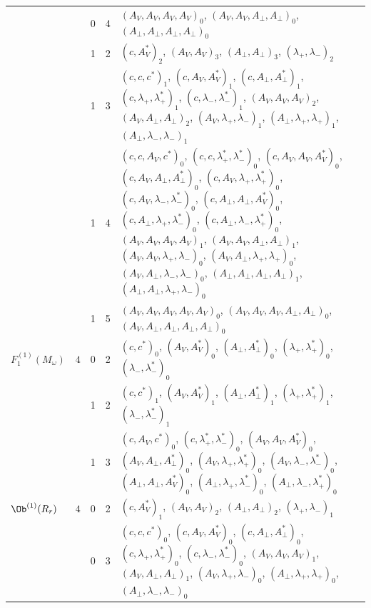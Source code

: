 {\begin{longtable}{>{\raggedright}p{2.3cm}|p{0.6cm}|p{0.25cm}|p{0.25cm}|>{\raggedright\arraybackslash}p{11.6cm}}
 &  & 0 & 4 & $(A_V,A_V,A_V,A_V)_{0}$, $(A_V,A_V,A_\perp,A_\perp)_{0}$, $(A_\perp,A_\perp,A_\perp,A_\perp)_{0}$ \\
 &  & 1 & 2 & $(c,A^*_V)_{2}$, $(A_V,A_V)_{3}$, $(A_\perp,A_\perp)_{3}$, $(\lambda_+,\lambda_-)_{2}$ \\
 &  & 1 & 3 & $(c,c,c^*)_{1}$, $(c,A_V,A^*_V)_{1}$, $(c,A_\perp,A^*_\perp)_{1}$, $(c,\lambda_+,\lambda^*_+)_{1}$, $(c,\lambda_-,\lambda^*_-)_{1}$, $(A_V,A_V,A_V)_{2}$, $(A_V,A_\perp,A_\perp)_{2}$, $(A_V,\lambda_+,\lambda_-)_{1}$, $(A_\perp,\lambda_+,\lambda_+)_{1}$, $(A_\perp,\lambda_-,\lambda_-)_{1}$ \\
 &  & 1 & 4 & $(c,c,A_V,c^*)_{0}$, $(c,c,\lambda^*_+,\lambda^*_-)_{0}$, $(c,A_V,A_V,A^*_V)_{0}$, $(c,A_V,A_\perp,A^*_\perp)_{0}$, $(c,A_V,\lambda_+,\lambda^*_+)_{0}$, $(c,A_V,\lambda_-,\lambda^*_-)_{0}$, $(c,A_\perp,A_\perp,A^*_V)_{0}$, $(c,A_\perp,\lambda_+,\lambda^*_-)_{0}$, $(c,A_\perp,\lambda_-,\lambda^*_+)_{0}$, $(A_V,A_V,A_V,A_V)_{1}$, $(A_V,A_V,A_\perp,A_\perp)_{1}$, $(A_V,A_V,\lambda_+,\lambda_-)_{0}$, $(A_V,A_\perp,\lambda_+,\lambda_+)_{0}$, $(A_V,A_\perp,\lambda_-,\lambda_-)_{0}$, $(A_\perp,A_\perp,A_\perp,A_\perp)_{1}$, $(A_\perp,A_\perp,\lambda_+,\lambda_-)_{0}$ \\
 &  & 1 & 5 & $(A_V,A_V,A_V,A_V,A_V)_{0}$, $(A_V,A_V,A_V,A_\perp,A_\perp)_{0}$, $(A_V,A_\perp,A_\perp,A_\perp,A_\perp)_{0}$ \\
\hline
$F_1^{(1)}(M_\omega)$ & $4$ & 0 & 2 & $(c,c^*)_{0}$, $(A_V,A^*_V)_{0}$, $(A_\perp,A^*_\perp)_{0}$, $(\lambda_+,\lambda^*_+)_{0}$, $(\lambda_-,\lambda^*_-)_{0}$ \\
 &  & 1 & 2 & $(c,c^*)_{1}$, $(A_V,A^*_V)_{1}$, $(A_\perp,A^*_\perp)_{1}$, $(\lambda_+,\lambda^*_+)_{1}$, $(\lambda_-,\lambda^*_-)_{1}$ \\
 &  & 1 & 3 & $(c,A_V,c^*)_{0}$, $(c,\lambda^*_+,\lambda^*_-)_{0}$, $(A_V,A_V,A^*_V)_{0}$, $(A_V,A_\perp,A^*_\perp)_{0}$, $(A_V,\lambda_+,\lambda^*_+)_{0}$, $(A_V,\lambda_-,\lambda^*_-)_{0}$, $(A_\perp,A_\perp,A^*_V)_{0}$, $(A_\perp,\lambda_+,\lambda^*_-)_{0}$, $(A_\perp,\lambda_-,\lambda^*_+)_{0}$ \\
\hline
$\Ob^{(1)}(R_r)$ & $4$ & 0 & 2 & $(c,A^*_V)_{1}$, $(A_V,A_V)_{2}$, $(A_\perp,A_\perp)_{2}$, $(\lambda_+,\lambda_-)_{1}$ \\
 &  & 0 & 3 & $(c,c,c^*)_{0}$, $(c,A_V,A^*_V)_{0}$, $(c,A_\perp,A^*_\perp)_{0}$, $(c,\lambda_+,\lambda^*_+)_{0}$, $(c,\lambda_-,\lambda^*_-)_{0}$, $(A_V,A_V,A_V)_{1}$, $(A_V,A_\perp,A_\perp)_{1}$, $(A_V,\lambda_+,\lambda_-)_{0}$, $(A_\perp,\lambda_+,\lambda_+)_{0}$, $(A_\perp,\lambda_-,\lambda_-)_{0}$ \\

\end{longtable}}
